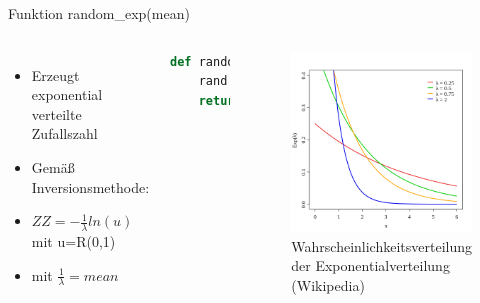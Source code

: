 \begin{frame}[fragile]{Funktion random\_exp(mean)}
  \begin{columns}
    \begin{itemize}
  	\item Erzeugt exponential verteilte Zufallszahl
  	\item Gemäß Inversionsmethode:
  	\item $ZZ = -\frac{1}{\lambda} ln(u)$ mit u=R(0,1)
  	\item mit $\frac{1}{\lambda} = mean$
  \end{itemize}
  \begin{lstlisting}[language=python]
def random_exp(mean):
    rand = random.random()
    return -(mean) * log(rand)
\end{lstlisting}
\logopythonbottom
    	\begin{figure}[h!]
    	\includegraphics[scale=0.3]{lib_random_exp_wahrscheinlichkeitsverteilung.png}
  			\caption{Wahrscheinlichkeitsverteilung der Exponentialverteilung \tiny{(Wikipedia)}}
		\end{figure}
  \end{columns}
\end{frame}	